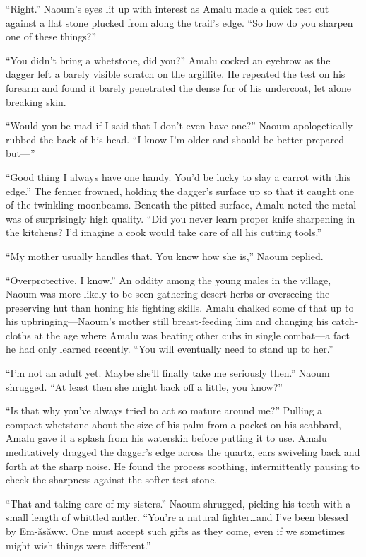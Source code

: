 ``Right.'' Naoum's eyes lit up with interest as Amalu made a quick test cut against a flat stone plucked from along the trail's edge. ``So how do you sharpen one of these things?''

``You didn't bring a whetstone, did you?'' Amalu cocked an eyebrow as the dagger left a barely visible scratch on the argillite. He repeated the test on his forearm and found it barely penetrated the dense fur of his undercoat, let alone breaking skin.

``Would you be mad if I said that I don't even have one?'' Naoum apologetically rubbed the back of his head. ``I know I'm older and should be better prepared but---''

``Good thing I always have one handy. You'd be lucky to slay a carrot with this edge.'' The fennec frowned, holding the dagger's surface up so that it caught one of the twinkling moonbeams. Beneath the pitted surface, Amalu noted the metal was of surprisingly high quality. ``Did you never learn proper knife sharpening in the kitchens? I'd imagine a cook would take care of all his cutting tools.''

``My mother usually handles that. You know how she is,'' Naoum replied.

``Overprotective, I know.'' An oddity among the young males in the village, Naoum was more likely to be seen gathering desert herbs or overseeing the preserving hut than honing his fighting skills. Amalu chalked some of that up to his upbringing---Naoum's mother still breast-feeding him and changing his catch-cloths at the age where Amalu was beating other cubs in single combat---a fact he had only learned recently. ``You will eventually need to stand up to her.''

``I'm not an adult yet. Maybe she'll finally take me seriously then.'' Naoum shrugged. ``At least then she might back off a little, you know?''

``Is that why you've always tried to act so mature around me?'' Pulling a compact whetstone about the size of his palm from a pocket on his scabbard, Amalu gave it a splash from his waterskin before putting it to use. Amalu meditatively dragged the dagger's edge across the quartz, ears swiveling back and forth at the sharp noise. He found the process soothing, intermittently pausing to check the sharpness against the softer test stone.

``That and taking care of my sisters.'' Naoum shrugged, picking his teeth with a small length of whittled antler. ``You're a natural fighter\ldots{}and I've been blessed by Em-ăsăww. One must accept such gifts as they come, even if we sometimes might wish things were different.''


